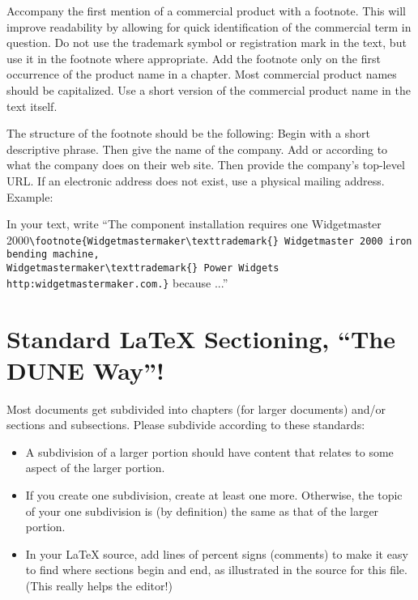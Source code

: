 Accompany the first mention of a commercial product with a footnote.  This will improve readability by allowing for quick identification of the commercial term in question. 
Do not use the trademark symbol \texttrademark{} or registration mark \textregistered{} in the text, but use it in the footnote where appropriate. Add the footnote only on the first occurrence of the product name in a chapter.
Most commercial product names should be capitalized.
Use a short version of the commercial product name in the text itself.
 
The structure of the footnote should be the following:
Begin with a short descriptive phrase.  Then give the name of the company.  Add \texttrademark{} or  \textregistered{} according to what the company does on their web site. Then provide the company's top-level URL. If an electronic address does not exist, use a physical mailing address. Example:

In your text, write ``The component installation requires one Widgetmaster \\
2000\verb|\footnote{Widgetmastermaker\texttrademark{} Widgetmaster 2000 iron bending machine, | \\
\verb|Widgetmastermaker\texttrademark{} Power Widgets http:widgetmastermaker.com.}| because ...''

\section{Standard \LaTeX{} Sectioning, ``The DUNE Way''!}
\label{sec:latex-sectioning}

Most documents get subdivided into chapters (for larger documents) and/or sections and subsections. Please subdivide according to these standards:

\begin{itemize}
\item A subdivision of a larger portion should have content that relates to some aspect of the larger portion. 
\item  If you create one subdivision, create at least one more. Otherwise, the topic of your one subdivision is (by definition) the same as that of the larger portion.
\item In your \LaTeX{} source, add lines of percent signs (comments) to make it easy to find where sections begin and end, as illustrated in the source for this file. (This really helps the editor!)
\end{itemize}

